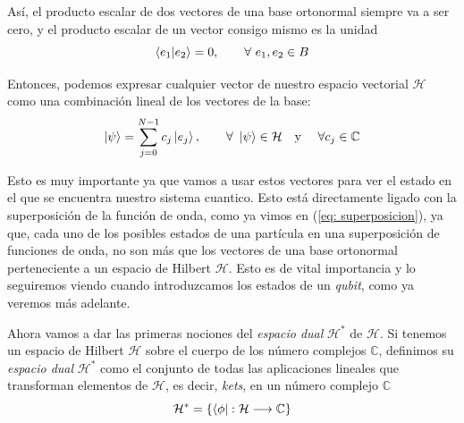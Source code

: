 \documentclass{article}
\numberwithin{equation}{section} %
\begin{document}
    \vspace{1.5mm}

    Así, el producto escalar de dos vectores de una base ortonormal siempre va a ser cero, y el producto escalar de un vector consigo mismo es la unidad
    \begin{equation}
        \braket{e_{1} | e_{2}} = 0, \qquad \forall \ e_{1}, e_{2} \in B 
    \end{equation}

    \vspace{1.5mm}

    Entonces, podemos expresar cualquier vector de nuestro espacio vectorial \( \mathcal{H} \) como una combinación lineal de los vectores de la base:
    \begin{equation}
        \ket{\psi} = \sum_{j = 0}^{N - 1} c_{j} \ket{e_{j}}, \qquad \forall \ \ket{\psi} \in \mathcal{H} \quad \text{y} \quad \ \forall c_{j} \in \mathbb{C}
        \label{eq: combinacion_lineal_Hilbert}
    \end{equation}

    \vspace{1.5mm}

    Esto es muy importante ya que vamos a usar estos vectores para ver el estado en el que se encuentra nuestro sistema cuantico. Esto está directamente ligado con la superposición de la función de onda, como ya vimos en (\ref{eq: superposicion}), ya que, cada uno de los posibles estados de una partícula en una superposición de funciones de onda, no son más que los vectores de una base ortonormal perteneciente a un espacio de Hilbert \( \mathcal{H} \). Esto es de vital importancia y lo seguiremos viendo cuando introduzcamos los estados de un \textit{qubit}, como ya veremos más adelante.

    \vspace{5mm}

    Ahora vamos a dar las primeras nociones del \textit{espacio dual} \( \mathcal{H} ^ {*} \) de \( \mathcal{H} \). Si tenemos un espacio de Hilbert \( \mathcal{H} \) sobre el cuerpo de los número complejos \( \mathbb{C} \), definimos su \textit{espacio dual} \( \mathcal{H} ^ {*} \) como el conjunto de todas las aplicaciones lineales que transforman elementos de \( \mathcal{H} \), es decir, \textit{kets}, en un número complejo \( \mathbb{C} \)
    \begin{equation*}
        \mathcal{H} ^ {*} = \{ \bra{\phi}: \mathcal{H} \longrightarrow \mathbb{C} \}
    \end{equation*}
\end{document}
